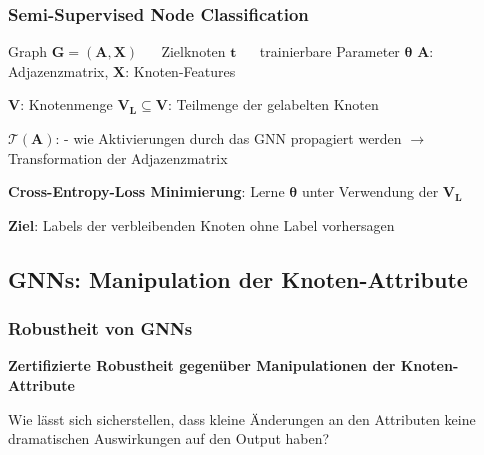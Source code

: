 \documentclass{beamer}
\begin{document}
\begin{frame}
  \frametitle{Semi-Supervised Node Classification}

  Graph $\boldsymbol{G} = (\boldsymbol{A}, \boldsymbol{X})$ $\quad$ Zielknoten $\boldsymbol{t}$ $\quad$ trainierbare Parameter $\boldsymbol{\theta}$\newline
  $\boldsymbol{A}$: Adjazenzmatrix, $\boldsymbol{X}$: Knoten-Features\newline

  $\boldsymbol{V}$: Knotenmenge\newline
  $\boldsymbol{V_L} \subseteq \boldsymbol{V}$: Teilmenge der gelabelten Knoten\newline

  $\boldsymbol{\mathcal{T}(A)}$:  - wie Aktivierungen durch das GNN propagiert werden
  $\rightarrow$ Transformation der Adjazenzmatrix\newline

  \textbf{Cross-Entropy-Loss Minimierung}:\newline
  Lerne $\boldsymbol{\theta}$ unter Verwendung der $\boldsymbol{V_L}$\newline

  \textbf{Ziel}: Labels der verbleibenden Knoten ohne Label vorhersagen

\end{frame}

\subsection{GNNs: Manipulation der Knoten-Attribute}

\begin{frame}
  \frametitle{Robustheit von GNNs}
  \textbf{Zertifizierte Robustheit gegenüber Manipulationen der Knoten-Attribute}\newline

  Wie lässt sich sicherstellen, dass kleine Änderungen an den Attributen keine dramatischen Auswirkungen auf den Output haben?
\end{frame}
\end{document}
